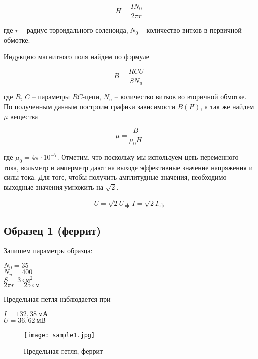 \begin{equation}
	H = \frac{I N_0}{2 \pi r}
\end{equation}

где $r$ -- радиус тороидального соленоида, $N_0$ -- количество витков в первичной обмотке.

Индукцию магнитного поля найдем по формуле

\begin{equation}
	B = \frac{R C U}{S N_u}
\end{equation}

где $R$, $C$ -- параметры $RC$-цепи, $N_u$ -- количество витков во вторичной обмотке.
По полученным данным построим графики зависимости $B(H)$, а так же найдем $\mu$ вещества

\begin{equation}
	\mu = \frac{B}{\mu_0 H}
\end{equation}

где $\mu_0 = 4 \pi \cdot 10^{-7}$.
Отметим, что поскольку мы используем цепь переменного тока, вольметр и амперметр дают на выходе
эффективные значение напряжения и силы тока. Для того, чтобы получить амплитудные значения,
необходимо выходные значения умножить на $\sqrt{2}$.

\begin{equation}
	U = \sqrt{2} U_{\text{эф}} ~~
	I = \sqrt{2} I_{\text{эф}}
\end{equation}

\subsection{Образец 1 (феррит)}

Запишем параметры образца:

\begin{center}
	$N_0 = 35$                 \\
	$N_u = 400$                \\
	$S = 3 ~ \text{см}^2$      \\
	$2 \pi r = 25 ~ \text{см}$
\end{center}

Предельная петля наблюдается при 

\begin{center}
	$I = 132,38 ~ \text{мА}$ \\
	$U = 36,62 ~ \text{мВ}$
\end{center}

\begin{figure}
	\centering
	\texttt{[image: sample1.jpg]}
	\caption{Предельная петля, феррит}
	\label{sample1_pic}
\end{figure}

